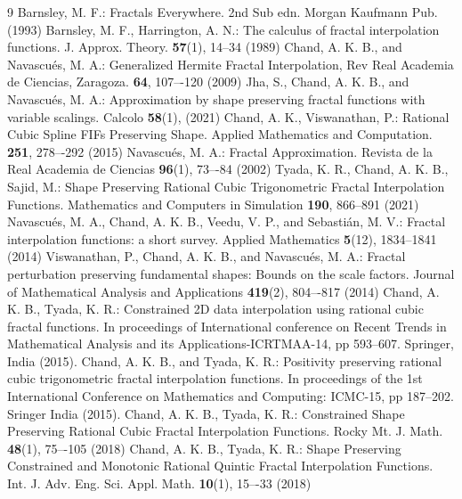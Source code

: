 \documentclass[runningheads]{llncs}
\begin{document}
\begin{thebibliography}{9}
		 Barnsley, M. F.: Fractals Everywhere. 2nd Sub edn. Morgan Kaufmann Pub. (1993)
		 Barnsley, M. F., Harrington, A. N.: The calculus of fractal interpolation functions. J. Approx. Theory. \textbf{57}(1), 14--34 (1989)
		 Chand, A. K. B., and Navascu\'{e}s, M. A.: Generalized Hermite Fractal Interpolation, Rev Real Academia de Ciencias, Zaragoza. \textbf{64}, 107–-120 (2009)
	 Jha, S., Chand, A. K. B., and Navascu\'{e}s, M. A.: Approximation by shape preserving fractal functions with variable scalings. Calcolo \textbf{58}(1), (2021)
		 Chand, A. K., Viswanathan, P.: Rational Cubic Spline FIFs Preserving Shape. Applied Mathematics and Computation. \textbf{251}, 278–-292 (2015)
		 Navascu\'{e}s, M. A.: Fractal Approximation. Revista de la Real Academia de Ciencias \textbf{96}(1), 73–-84 (2002)
		 Tyada, K. R., Chand, A. K. B., Sajid, M.: Shape Preserving Rational Cubic Trigonometric Fractal Interpolation Functions. Mathematics and Computers in Simulation \textbf{190}, 866--891 (2021)
	 Navascu\'{e}s, M. A., Chand, A. K. B., Veedu, V. P., and Sebasti\'{a}n, M. V.: Fractal interpolation functions: a short survey. Applied Mathematics \textbf{5}(12), 1834--1841 (2014)
	 Viswanathan, P., Chand, A. K. B., and Navascu\'{e}s, M. A.: Fractal perturbation preserving fundamental shapes: Bounds on the scale factors. Journal of Mathematical Analysis and Applications \textbf{419}(2), 804–-817 (2014)
		 Chand, A. K. B., Tyada, K. R.: Constrained 2D data interpolation using rational cubic fractal functions. In proceedings of International conference on Recent Trends in Mathematical Analysis and its Applications-ICRTMAA-14, pp 593--607. Springer, India (2015).
		 Chand, A. K. B., and Tyada, K. R.: Positivity preserving rational cubic trigonometric fractal interpolation functions. In proceedings of the 1st International Conference on Mathematics and Computing: ICMC-15, pp 187--202. Sringer India (2015).
		 Chand, A. K. B., Tyada, K. R.: Constrained Shape Preserving Rational Cubic Fractal Interpolation Functions. Rocky Mt. J. Math. \textbf{48}(1), 75–-105 (2018)
		 Chand, A. K. B., Tyada, K. R.: Shape Preserving Constrained and Monotonic Rational Quintic Fractal Interpolation Functions. Int. J. Adv. Eng. Sci. Appl. Math. \textbf{10}(1), 15–-33 (2018)
		
	\end{thebibliography}
	
\end{document}
